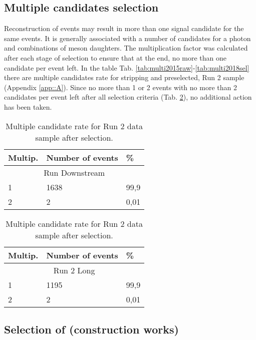\subsection{Multiple candidates selection}
\label{subsec::multi}

Reconstruction of events may result in more than one signal candidate for the same \Bs events. It is generally associated with a number of candidates for a photon and combinations of \Ds meson daughters. The multiplication factor was calculated after each stage of selection to ensure that at the end, no more than one candidate per event left. In the table Tab. \ref{tab:multi2015raw}-\ref{tab:multi2018sel} there are multiple candidates rate for stripping and preselected, Run 2 sample (Appendix \ref{app::A}). Since no more than 1 or 2 events with no more than 2 candidates per event left after all selection criteria (Tab. \ref{tab:multiBDT}), no additional action has been taken. 

\begin{table}[h!]
\begin{center}
\begin{tabular}{ p{2.6cm}p{3.1cm}p{0.6cm} }
\hline
\hline
Multip.  & Number of events & \% \\
\hline
    \multicolumn{3}{c}{Run Downstream}\\
\hline

     1    & 1638	& 99,9 \\
     2    & 2	& 0,01 \\

\hline
\end{tabular}
\quad
\begin{tabular}{ p{2.6cm}p{3.1cm}p{0.6cm} }
\hline
\hline
Multip.  & Number of events & \% \\
\hline
    \multicolumn{3}{c}{Run 2 Long}\\
\hline

     1    & 1195	& 99,9 \\
     2    & 2	& 0,01 \\

\hline
\end{tabular}
\caption{Multiple candidate rate for Run 2 data sample after selection.}
\label{tab:multiBDT}
\end{center}
\end{table}%

\subsection{Selection of \Kstarm (construction works)}
\label{subsex::veto_non_reso}

